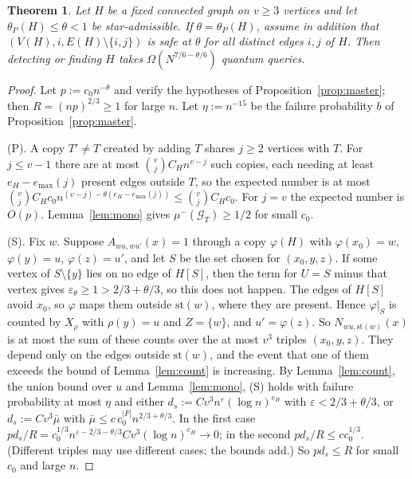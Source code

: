 \documentclass[11pt]{article}
\newtheorem{theorem}{Theorem}[section]
\theoremstyle{remark}
\newcommand{\st}{\mathrm{st}}
\newcommand{\abs}[1]{\lvert #1\rvert}
\newcommand{\Ev}{\mathcal{G}}
\begin{document}
\begin{theorem}\label{thm:ext}
Let $H$ be a fixed connected graph on $v\ge3$ vertices and let $\theta_P(H)\le\theta<1$ be star-admissible. If $\theta=\theta_P(H)$, assume in addition that $(V(H),i,E(H)\setminus\{i,j\})$ is safe at $\theta$ for all distinct edges $i,j$ of $H$. Then detecting or finding $H$ takes $\Omega(N^{7/6-\theta/6})$ quantum queries.
\end{theorem}

\begin{proof}
Let $p:=c_0n^{-\theta}$ and verify the hypotheses of Proposition~\ref{prop:master}; then $R=(np)^{2/3}\ge1$ for large $n$. Let $\eta:=n^{-15}$ be the failure probability $b$ of Proposition~\ref{prop:master}.

(P). A copy $T'\ne T$ created by adding $T$ shares $j\ge2$ vertices with $T$. For $j\le v-1$ there are at most $\binom vjC_Hn^{v-j}$ such copies, each needing at least $e_H-e_{\max}(j)$ present edges outside $T$, so the expected number is at most $\binom vjC_Hc_0n^{(v-j)-\theta(e_H-e_{\max}(j))}\le\binom vjC_Hc_0$. For $j=v$ the expected number is $O(p)$. Lemma~\ref{lem:mono} gives $\mu^-(\Ev_T)\ge1/2$ for small $c_0$.

(S). Fix $w$. Suppose $A_{wu,wu'}(x)=1$ through a copy $\varphi(H)$ with $\varphi(x_0)=w$, $\varphi(y)=u$, $\varphi(z)=u'$, and let $S$ be the set chosen for $(x_0,y,z)$. If some vertex of $S\setminus\{y\}$ lies on no edge of $H[S]$, then the term for $U=S$ minus that vertex gives $\varepsilon_\theta\ge1>2/3+\theta/3$, so this does not happen. The edges of $H[S]$ avoid $x_0$, so $\varphi$ maps them outside $\st(w)$, where they are present. Hence $\varphi|_S$ is counted by $X_\rho$ with $\rho(y)=u$ and $Z=\{w\}$, and $u'=\varphi(z)$. So $N_{wu,\st(w)}(x)$ is at most the sum of these counts over the at most $v^3$ triples $(x_0,y,z)$. They depend only on the edges outside $\st(w)$, and the event that one of them exceeds the bound of Lemma~\ref{lem:count} is increasing. By Lemma~\ref{lem:count}, the union bound over $u$ and Lemma~\ref{lem:mono}, (S) holds with failure probability at most $\eta$ and either $d_s:=Cv^3n^\varepsilon(\log n)^{e_H}$ with $\varepsilon<2/3+\theta/3$, or $d_s:=Cv^3\bar\mu$ with $\bar\mu\le c\,c_0^{\abs F}n^{2/3+\theta/3}$. In the first case $pd_s/R=c_0^{1/3}n^{\varepsilon-2/3-\theta/3}Cv^3(\log n)^{e_H}\to0$; in the second $pd_s/R\le cc_0^{1/3}$. (Different triples may use different cases; the bounds add.) So $pd_s\le R$ for small $c_0$ and large $n$.


\end{proof}
\end{document}
